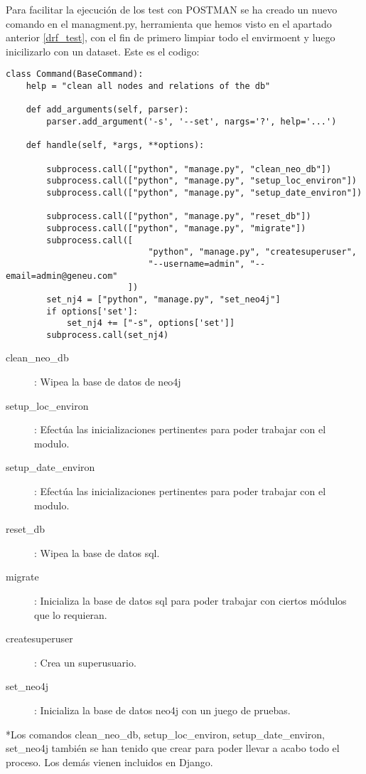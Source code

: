 Para facilitar la ejecución de los test con POSTMAN se ha creado un nuevo comando en el managment.py, herramienta que hemos visto en el apartado anterior \ref{drf_test}, con el fin de primero limpiar todo el envirmoent y luego inicilizarlo con un dataset.
Este es el codigo:
\begin{lstlisting}
class Command(BaseCommand):
    help = "clean all nodes and relations of the db"

    def add_arguments(self, parser):
        parser.add_argument('-s', '--set', nargs='?', help='...')

    def handle(self, *args, **options):

        subprocess.call(["python", "manage.py", "clean_neo_db"])
        subprocess.call(["python", "manage.py", "setup_loc_environ"])
        subprocess.call(["python", "manage.py", "setup_date_environ"])

        subprocess.call(["python", "manage.py", "reset_db"])
        subprocess.call(["python", "manage.py", "migrate"])
        subprocess.call([
                            "python", "manage.py", "createsuperuser",
                            "--username=admin", "--email=admin@geneu.com"
                        ])
        set_nj4 = ["python", "manage.py", "set_neo4j"]
        if options['set']:
            set_nj4 += ["-s", options['set']]
        subprocess.call(set_nj4)
\end{lstlisting}

\begin{description}
\item[clean\_neo\_db]: Wipea la base de datos de neo4j
\item[setup\_loc\_environ]: Efectúa las inicializaciones pertinentes para poder trabajar con el modulo.
\item[setup\_date\_environ]: Efectúa las inicializaciones pertinentes para poder trabajar con el modulo.
\item[reset\_db]: Wipea la base de datos sql.
\item[migrate]: Inicializa la base de datos sql para poder trabajar con ciertos módulos que lo requieran.
\item[createsuperuser]: Crea un superusuario.
\item[set\_neo4j]: Inicializa la base de datos neo4j con un juego de pruebas.
\end{description}
*Los comandos clean\_neo\_db, setup\_loc\_environ, setup\_date\_environ, set\_neo4j también se han tenido que crear para poder llevar a acabo todo el proceso. Los demás vienen incluidos en Django.